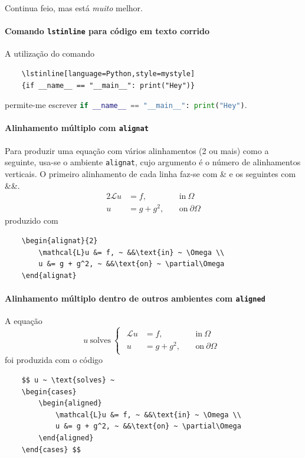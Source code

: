 \documentclass[11pt]{article}
\begin{document}


Continua feio, mas está \textit{muito} melhor.

\paragraph{Comando \texttt{lstinline} para código em texto corrido}
A utilização do comando
\begin{verbatim}
    \lstinline[language=Python,style=mystyle]
    {if __name__ == "__main__": print("Hey")}
\end{verbatim}
permite-me escrever
\lstinline[language=Python,style=mystyle]{if __name__ == "__main__": print("Hey")}.

\paragraph{Alinhamento múltiplo com \texttt{alignat}}
Para produzir uma equação com vários alinhamentos (2 ou mais) como a seguinte,
usa-se o ambiente \texttt{alignat}, cujo argumento é o número de alinhamentos
verticais.
O primeiro alinhamento de cada linha faz-se com \& e os seguintes com \&\&.
\begin{alignat}{2}
    \mathcal{L}u &= f, ~ &&\text{in} ~ \Omega \\
    u &= g + g^2, ~ &&\text{on} ~ \partial\Omega
\end{alignat}
produzido com
\begin{verbatim}
    \begin{alignat}{2}
        \mathcal{L}u &= f, ~ &&\text{in} ~ \Omega \\
        u &= g + g^2, ~ &&\text{on} ~ \partial\Omega
    \end{alignat}
\end{verbatim}

\paragraph{Alinhamento múltiplo dentro de outros ambientes com \texttt{aligned}}
A equação
$$ u ~ \text{solves} ~
\begin{cases}
    \begin{aligned}
        \mathcal{L}u &= f, ~ &&\text{in} ~ \Omega \\
        u &= g + g^2, ~ &&\text{on} ~ \partial\Omega
    \end{aligned}
\end{cases} $$
foi produzida com o código
\begin{verbatim}
    $$ u ~ \text{solves} ~
    \begin{cases}
        \begin{aligned}
            \mathcal{L}u &= f, ~ &&\text{in} ~ \Omega \\
            u &= g + g^2, ~ &&\text{on} ~ \partial\Omega
        \end{aligned}
    \end{cases} $$
\end{verbatim}
\end{document}

